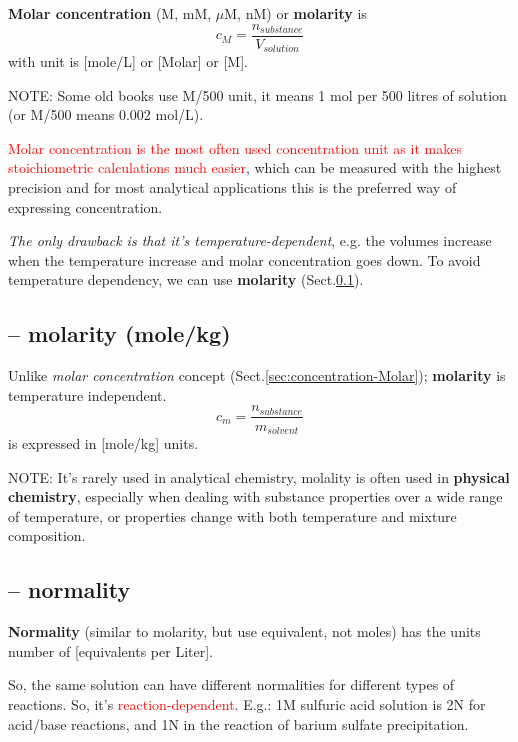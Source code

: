 {\bf Molar concentration} (M, mM, $\mu$M, nM) or {\bf molarity} is
\begin{equation}
  \label{eq:1002}
  c_M = \frac{n_{substance}}{V_{solution}}
\end{equation}
with unit is [mole/L] or [Molar] or [M].

NOTE: Some old books use M/500 unit, it means 1 mol per 500 litres of solution
(or M/500 means 0.002 mol/L).

\textcolor{red}{Molar concentration is the most often used concentration unit as
it makes stoichiometric calculations much easier}, which can be measured with
the highest precision and for most analytical applications this is the preferred
way of expressing concentration.

{\it The only drawback is that it's temperature-dependent}, e.g. the volumes
increase when the temperature increase and molar concentration goes down. 
To avoid temperature dependency, we can use {\bf molarity}
(Sect.\ref{sec:concentration-molarity}).

\subsection{-- molarity (mole/kg)}
\label{sec:concentration-molarity}

Unlike {\it molar concentration} concept (Sect.\ref{sec:concentration-Molar});
{\bf molarity} is temperature independent.
\begin{equation}
  \label{eq:1003}
  c_m = \frac{n_{substance}}{m_{solvent}}
\end{equation}
is expressed in [mole/kg] units. 

NOTE: It's rarely used in analytical chemistry, molality is often used in {\bf
physical chemistry}, especially when dealing with substance properties over a
wide range of temperature, or properties change with both temperature and
mixture composition.

\subsection{-- normality}
\label{sec:concentration-normality}

{\bf Normality} (similar to molarity, but use equivalent, not moles) has the
units number of [equivalents per Liter]. 

So, the same solution can have different normalities for different types of
reactions. So, it's \textcolor{red}{reaction-dependent}. E.g.: 1M sulfuric acid
solution is 2N for acid/base reactions, and 1N in the reaction of barium sulfate
precipitation.

